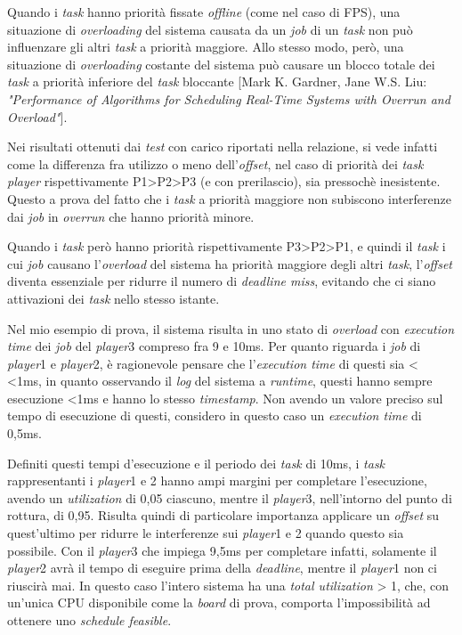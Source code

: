 \documentclass{article}
\begin{document}
Quando i \textit{task} hanno priorità fissate \textit{offline} (come nel caso di FPS), una situazione di \textit{overloading} del sistema causata da un \textit{job} di un \textit{task} non può influenzare gli altri \textit{task} a priorità maggiore. Allo stesso modo, però, una situazione di \textit{overloading} costante del sistema può causare un blocco totale dei \textit{task} a priorità inferiore del \textit{task} bloccante [Mark K. Gardner, Jane W.S. Liu: \textit{"Performance of Algorithms for Scheduling Real-Time Systems with Overrun and Overload"}].

Nei risultati ottenuti dai \textit{test} con carico riportati nella relazione, si vede infatti come la differenza fra utilizzo o meno dell'\textit{offset}, nel caso di priorità dei \textit{task player} rispettivamente P1>P2>P3 (e con prerilascio), sia pressochè inesistente. Questo a prova del fatto che i \textit{task} a priorità maggiore non subiscono interferenze dai \textit{job} in \textit{overrun} che hanno priorità minore.

Quando i \textit{task} però hanno priorità rispettivamente P3>P2>P1, e quindi il \textit{task} i cui \textit{job} causano l'\textit{overload} del sistema ha priorità maggiore degli altri \textit{task}, l'\textit{offset} diventa essenziale per ridurre il numero di \textit{deadline miss}, evitando che ci siano attivazioni dei \textit{task} nello stesso istante.

Nel mio esempio di prova, il sistema risulta in uno stato di \textit{overload} con \textit{execution time} dei \textit{job} del \textit{player}3 compreso fra 9 e 10ms.
Per quanto riguarda i \textit{job} di \textit{player}1 e \textit{player}2, è ragionevole pensare che l'\textit{execution time} di questi sia < <1ms, in quanto osservando il \textit{log} del sistema a \textit{runtime}, questi hanno sempre esecuzione <1ms e hanno lo stesso \textit{timestamp}. Non avendo un valore preciso sul tempo di esecuzione di questi, considero in questo caso un \textit{execution time} di 0,5ms.

Definiti questi tempi d'esecuzione e il periodo dei \textit{task} di 10ms, i \textit{task} rappresentanti i \textit{player}1 e 2 hanno ampi margini per completare l'esecuzione, avendo un \textit{utilization} di 0,05 ciascuno, mentre il \textit{player}3, nell'intorno del punto di rottura, di 0,95. Risulta quindi di particolare importanza applicare un \textit{offset} su quest'ultimo per ridurre le interferenze sui \textit{player}1 e 2 quando questo sia possibile. Con il \textit{player}3 che impiega 9,5ms per completare infatti, solamente il \textit{player}2 avrà il tempo di eseguire prima della \textit{deadline}, mentre il \textit{player}1 non ci riuscirà mai. In questo caso l'intero sistema ha una \textit{total utilization} > 1, che, con un'unica CPU disponibile come la \textit{board} di prova, comporta l'impossibilità ad ottenere uno \textit{schedule feasible}.
\end{document}
